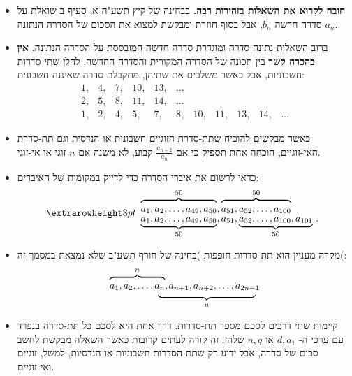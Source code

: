 \begin{itemize}


\item
\textbf{חובה לקרוא את השאלות בזהירות רבה.}
בבחינה של קיץ תשע"ה א, סעיף ב שואלת על סדרה חדשה
${b_n}$,
אבל בסוף חוזרת ומבקשת למצוא את הסכום של הסדרה הנתונה
${a_n}$.

\item 
ברוב השאלות נתונה סדרה ומוגדרת סדרה חדשה המובססת על הסדרה הנתונה. 
\textbf{אין בהכרח קשר}
בין תכונה של הסדרה המקורית והסדרה החדשה. להלן שתי סדרות חשבוניות, אבל כאשר משלבים את שתיהן, מתקבלת סדרה שאיננה חשבונית:
\[
\begin{array}{rrrrrrrrrrr}
1,& 4,& 7,& 10,& 13,& \ldots\\
2,& 5,& 8,& 11,& 14, &\ldots\\
1,& 2,& 4,& 5,& 7,& 8,& 10,& 11,& 13,& 14, &\ldots
\end{array}
\]
\item
כאשר מבקשים להוכיח שתת-סדרת הזוגיים חשבונית או הנדסית וגם תת-סדרת האי-זוגיים, הוכחה אחת תספיק כי אם 
$\displaystyle \frac{a_{n+2}}{a_n}$
קבוע, לא משנה אם 
$n$
זוגי או אי-זוגי.


\item
כדאי לרשום את איברי הסדרה כדי לדייק במקומות של האיברים:
\[
\setlength{\extrarowheight}{8pt}
\begin{array}{l}
\overbrace{\rule{0pt}{8pt}a_1, a_2, \ldots, a_{49}, a_{50}}^{50}, \overbrace{\rule{0pt}{8pt}a_{51}, a_{52},\ldots, a_{100}}^{50}\\
\underbrace{\rule{0pt}{8pt}a_1, a_2, \ldots, a_{49}, a_{50}}_{50}, a_{51}, \underbrace{\rule{0pt}{8pt}a_{52}, \ldots, a_{100}, a_{101}}_{50}\,.
\end{array}
\]
\vspace{-3ex}

\item
מקרה מעניין הוא תת-סדרות חופפות )בחינה של חורף תשע"ב שלא נמצאת במסמך זה(:
\[
\renewcommand{\arraystretch}{.4}
\begin{array}{ll}
\overbrace{\rule{0pt}{8pt}a_1, a_2, \ldots, a_n}^{n},&\hspace{-9pt}a_{n+1}, a_{n+2}, \ldots, a_{2n-1}\\
&\hspace{-2em}\underbrace{\rule{10em}{0pt}}_{n}
\end{array}
\]
\vspace{-4ex}
\item
קיימות שתי דרכים לסכם מספר תת-סדרות. דרך אחת היא לסכם כל תת-סדרה בנפרד עם ערכי ה-%
$d, a_1$
או
$n, q$
שלהן. זה קורה לעתים קרובות כאשר השאלה מבקשת לחשב סכום של סדרה, אבל ידוע רק שתת-הסדרות חשבוניות או הנדסיות, למשל, זוגיים ואי-זוגיים.


\end{itemize}
